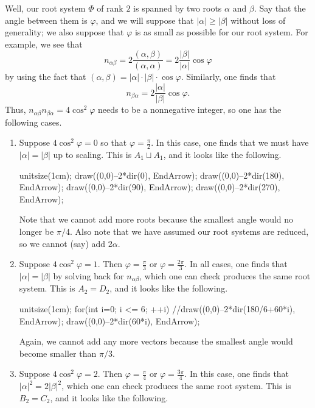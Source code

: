\documentclass[../notes.tex]{subfiles}
\begin{document}
Well, our root system $\Phi$ of rank $2$ is spanned by two roots $\alpha$ and $\beta$. Say that the angle between them is $\varphi$, and we will suppose that $\left|\alpha\right|\ge\left|\beta\right|$ without loss of generality; we also suppose that $\varphi$ is as small as possible for our root system. For example, we see that
\[n_{\alpha\beta}=2\frac{(\alpha,\beta)}{(\alpha,\alpha)}=2\frac{\left|\beta\right|}{\left|\alpha\right|}\cos\varphi\]
by using the fact that $(\alpha,\beta)=\left|\alpha\right|\cdot\left|\beta\right|\cdot\cos\varphi$. Similarly, one finds that
\[n_{\beta\alpha}=2\frac{\left|\alpha\right|}{\left|\beta\right|}\cos\varphi.\]
Thus, $n_{\alpha\beta}n_{\beta\alpha}=4\cos^2\varphi$ needs to be a nonnegative integer, so one has the following cases.
\begin{enumerate}
	\item Suppose $4\cos^2\varphi=0$ so that $\varphi=\frac\pi2$. In this case, one finds that we must have $\left|\alpha\right|=\left|\beta\right|$ up to scaling. This is $A_1\sqcup A_1$, and it looks like the following.
	\begin{center}
		\begin{asy}
			unitsize(1cm);
			draw((0,0)--2*dir(0), EndArrow);
			draw((0,0)--2*dir(180), EndArrow);
			draw((0,0)--2*dir(90), EndArrow);
			draw((0,0)--2*dir(270), EndArrow);
		\end{asy}
	\end{center}
	Note that we cannot add more roots because the smallest angle would no longer be $\pi/4$. Also note that we have assumed our root systems are reduced, so we cannot (say) add $2\alpha$.
	\item Suppose $4\cos^2\varphi=1$. Then $\varphi=\frac\pi3$ or $\varphi=\frac{2\pi}3$. In all cases, one finds that $\left|\alpha\right|=\left|\beta\right|$ by solving back for $n_{\alpha\beta}$, which one can check produces the same root system. This is $A_2=D_2$, and it looks like the following.
	\begin{center}
		\begin{asy}
			unitsize(1cm);
			for(int i=0; i <= 6; ++i)
			{
				//draw((0,0)--2*dir(180/6+60*i), EndArrow);
				draw((0,0)--2*dir(60*i), EndArrow);
			}
		\end{asy}
	\end{center}
	Again, we cannot add any more vectors because the smallest angle would become smaller than $\pi/3$.
	\item Suppose $4\cos^2\varphi=2$. Then $\varphi=\frac\pi4$ or $\varphi=\frac{3\pi}4$. In this case, one finds that $\left|\alpha\right|^2=2\left|\beta\right|^2$, which one can check produces the same root system. This is $B_2=C_2$, and it looks like the following.

\end{enumerate}
\end{document}
